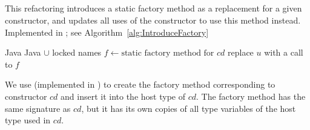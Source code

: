 \subsection{}
This refactoring introduces a static factory method as a replacement for a given constructor, and updates all uses of the constructor to use this method instead. Implemented in ; see Algorithm~\ref{alg:IntroduceFactory}

\begin{algorithm}
\caption{$\refactoring{Introduce Factory}(cd : \type{ConstructorDecl})$}
\label{alg:IntroduceFactory}
\begin{algorithmic}[1]
\REQUIRE Java
\ENSURE Java $\cup$ locked names
\medskip
\STATE $f \leftarrow \text{static factory method for $cd$}$
    \STATE replace $u$ with a call to $f$
  \ENDIF
\ENDFOR
\end{algorithmic}
\end{algorithm}

We use  (implemented in ) to create the factory method corresponding to constructor $cd$ and insert it into the host type of $cd$. The factory method has the same signature as $cd$, but it has its own copies of all type variables of the host type used in $cd$.
